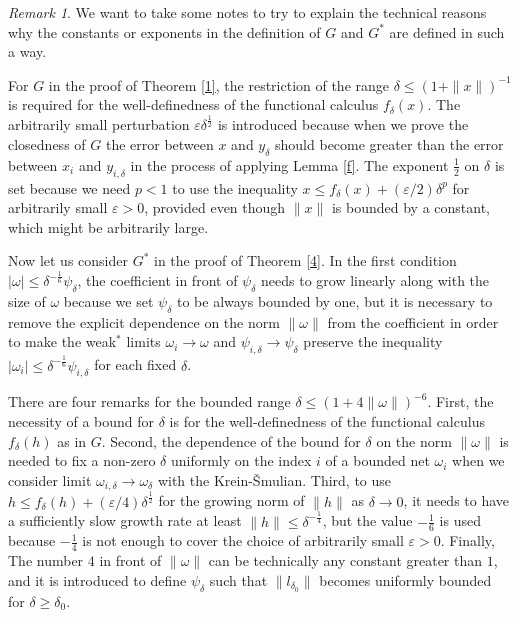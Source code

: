\documentclass[noamsfonts,a4paper,10pt]{amsart}
\theoremstyle{plain}
\theoremstyle{definition}
\theoremstyle{remark}
\newtheorem{rmk}[thm]{Remark}
\begin{document}
\begin{rmk}
We want to take some notes to try to explain the technical reasons why the constants or exponents in the definition of $G$ and $G^*$ are defined in such a way.

For $G$ in the proof of Theorem \ref{1}, the restriction of the range $\delta\le(1+\|x\|)^{-1}$ is required for the well-definedness of the functional calculus $f_\delta(x)$.
The arbitrarily small perturbation $\varepsilon\delta^{\frac12}$ is introduced because when we prove the closedness of $G$ the error between $x$ and $y_\delta$ should become greater than the error between $x_i$ and $y_{i,\delta}$ in the process of applying Lemma \ref{f}.
The exponent $\frac12$ on $\delta$ is set because we need $p<1$ to use the inequality $x\le f_\delta(x)+(\varepsilon/2)\delta^p$ for arbitrarily small $\varepsilon>0$, provided even though $\|x\|$ is bounded by a constant, which might be arbitrarily large.

Now let us consider $G^*$ in the proof of Theorem \ref{4}.
In the first condition $|\omega|\le\delta^{-\frac16}\psi_\delta$, the coefficient in front of $\psi_\delta$ needs to grow linearly along with the size of $\omega$ because we set $\psi_\delta$ to be always bounded by one, but it is necessary to remove the explicit dependence on the norm $\|\omega\|$ from the coefficient in order to make the weak$^*$ limits $\omega_i\to\omega$ and $\psi_{i,\delta}\to\psi_\delta$ preserve the inequality $|\omega_i|\le\delta^{-\frac16}\psi_{i,\delta}$ for each fixed $\delta$.

There are four remarks for the bounded range $\delta\le(1+4\|\omega\|)^{-6}$.
First, the necessity of a bound for $\delta$ is for the well-definedness of the functional calculus $f_\delta(h)$ as in $G$.
Second, the dependence of the bound for $\delta$ on the norm $\|\omega\|$ is needed to fix a non-zero $\delta$ uniformly on the index $i$ of a bounded net $\omega_i$ when we consider limit $\omega_{i,\delta}\to\omega_\delta$ with the Krein-\v Smulian.
Third, to use $h\le f_\delta(h)+(\varepsilon/4)\delta^{\frac12}$ for the growing norm of $\|h\|$ as $\delta\to0$, it needs to have a sufficiently slow growth rate at least $\|h\|\le\delta^{-\frac14}$, but the value $-\frac16$ is used because $-\frac14$ is not enough to cover the choice of arbitrarily small $\varepsilon>0$.
Finally, The number $4$ in front of $\|\omega\|$ can be technically any constant greater than $1$, and it is introduced to define $\psi_\delta$ such that $\|l_{\delta_0}\|$ becomes uniformly bounded for $\delta\ge\delta_0$.

\end{rmk}
\end{document}
